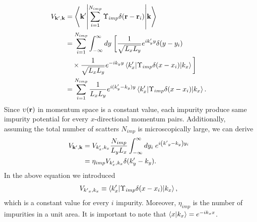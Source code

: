 \begin{subequations} \label{eq_c24}
\begin{align}
 V_{\vb{k'},\vb{k}} & =
 \mel**{\vb{k'}}{\sum_{i=1}^{N_{imp}}
 \Upsilon_{imp} \delta(\vb{r}-\vb{r}_i)}{\vb{k}} \label{eq_c24a} \\
 & =
 \sum_{i=1}^{N_{imp}}
 \int_{-\infty}^{\infty} dy\; \bigg[
 \frac{1}{\sqrt{L_xL_y}} e^{ik'_y y} \delta(y-y_i) \nonumber \\
 & \quad\times \frac{1}{\sqrt{L_xL_y}} e^{-i{k}_y y}
 \mel**{k'_x}{\Upsilon_{imp} \delta(x-x_i)}{k_x} \bigg] \label{eq_c24b} \\
  & =
 \sum_{i=1}^{N_{imp}} \frac{1}{{L_xL_y}}
 e^{i(k'_y - k_y )y}
 \mel**{k'_x}{\Upsilon_{imp} \delta(x-x_i)}{k_x} \label{eq_c24c}.
\end{align}
\end{subequations}
Since $\upsilon (\vb{r})$ in momentum space is a constant value, each impurity  produce same impurity potential for every $x$-directional momentum pairs. Additionally, assuming the total number of scatters $N_{imp}$ is microscopically large, we can derive
\begin{subequations} \label{eq_c25}
  \begin{align}
    V_{\vb{k'},\vb{k}}
    & =
    V_{k'_x,k_x}
    \frac{N_{imp}}{L_y L_x} \int_{-\infty}^{\infty} dy_i\;
    e^{i\qty({k'}_y - k_y)y_i} \label{eq_c25a} \\
    & =
    \eta_{imp} V_{k'_x,k_x} \delta(k'_y - k_y). \label{eq_c25b}
  \end{align}
\end{subequations}
In the above equation we introduced
\begin{equation} \label{eq_c26}
  V_{{k'}_x,k_x} \equiv
  \mel**{k'_x}{\Upsilon_{imp} \delta(x-x_i)}{k_x},
\end{equation}
which is a constant value for every $i$ impurity. Moreover, $\eta_{imp}$ is the number of impurities in a unit area. It is important to note that $\braket{x}{k_x} = e^{-ik_xx}$.

